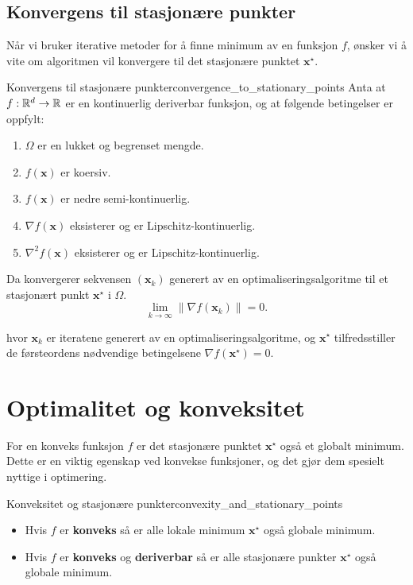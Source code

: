 \subsection{Konvergens til stasjonære punkter}
Når vi bruker iterative metoder for å finne minimum av en funksjon \(f\), ønsker vi å vite om algoritmen vil konvergere til det stasjonære punktet \(\symbf{x}^\star\).

\begin{theorem}{Konvergens til stasjonære punkter}{convergence_to_stationary_points}
	Anta at \(f: \mathbb{R}^d \to \mathbb{R}\) er en kontinuerlig deriverbar funksjon, og at følgende betingelser er oppfylt:
	\begin{enumerate}
		\item \(\Omega\) er en lukket og begrenset mengde.
		\item \(f(\symbf{x})\) er koersiv.
		\item \(f(\symbf{x})\) er nedre semi-kontinuerlig.
		\item \(\nabla f(\symbf{x})\) eksisterer og er Lipschitz-kontinuerlig.
		\item \(\nabla^2 f(\symbf{x})\) eksisterer og er Lipschitz-kontinuerlig.
	\end{enumerate}
	Da konvergerer sekvensen \((\symbf{x}_k)\) generert av en optimaliseringsalgoritme til et stasjonært punkt \(\symbf{x}^\star\) i \(\Omega\).
	\[
		\lim_{k \to \infty} \|\nabla f(\symbf{x}_k)\| = 0.
	\]
	
	hvor \(\symbf{x}_k\) er iteratene generert av en optimaliseringsalgoritme, og \(\symbf{x}^\star\) tilfredsstiller de førsteordens nødvendige betingelsene \(\nabla f(\symbf{x}^\star) = 0\).

\end{theorem}

\section{Optimalitet og konveksitet}
\label{sec:optimality_and_convexity}
For en konveks funksjon \(f\) er det stasjonære punktet \(\mathbf{x}^\star\) også et globalt minimum. Dette er en viktig egenskap ved konvekse funksjoner, og det gjør dem spesielt nyttige i optimering.

\begin{remark}{Konveksitet og stasjonære punkter}{convexity_and_stationary_points}
	\begin{itemize}
		\item Hvis \(f\) er \textbf{konveks} så er alle lokale minimum \(\mathbf{x}^\star\) også globale minimum.
		\item Hvis \(f\) er \textbf{konveks} og \textbf{deriverbar} så er alle stasjonære punkter \(\mathbf{x}^\star\) også globale minimum.
	\end{itemize}
\end{remark}

